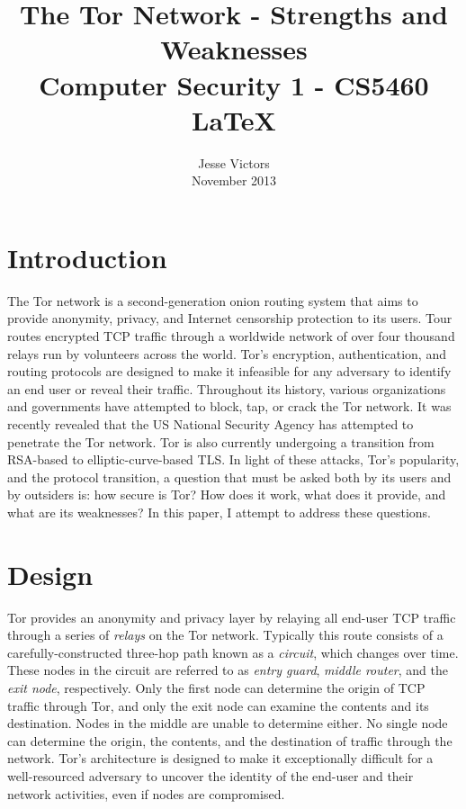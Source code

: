 \documentclass[journal]{IEEEtran}
\begin{document}
\title{The Tor Network - Strengths and Weaknesses \\ \Large Computer Security 1 - CS5460 \\ \LaTeX{}}
\author{Jesse Victors \\ November 2013}

\maketitle

\section{Introduction}

The Tor network is a second-generation onion routing system that aims to provide anonymity, privacy, and Internet censorship protection to its users. Tour routes encrypted TCP traffic through a worldwide network of over four thousand relays run by volunteers across the world. Tor's encryption, authentication, and routing protocols are designed to make it infeasible for any adversary to identify an end user or reveal their traffic. Throughout its history, various organizations and governments have attempted to block, tap, or crack the Tor network. It was recently revealed that the US National Security Agency has attempted to penetrate the Tor network. Tor is also currently undergoing a transition from RSA-based to elliptic-curve-based TLS. In light of these attacks, Tor's popularity, and the protocol transition, a question that must be asked both by its users and by outsiders is: how secure is Tor? How does it work, what does it provide, and what are its weaknesses? In this paper, I attempt to address these questions.

\section{Design}

Tor provides an anonymity and privacy layer by relaying all end-user TCP traffic through a series of \textit{relays} on the Tor network. Typically this route consists of a carefully-constructed three-hop path known as a \textit{circuit}, which changes over time. These nodes in the circuit are referred to as \textit{entry guard}, \textit{middle router}, and the \textit{exit node}, respectively. Only the first node can determine the origin of TCP traffic through Tor, and only the exit node can examine the contents and its destination. Nodes in the middle are unable to determine either. No single node can determine the origin, the contents, and the destination of traffic through the network. Tor's architecture is designed to make it exceptionally difficult for a well-resourced adversary to uncover the identity of the end-user and their network activities, even if nodes are compromised.\cite{McCoy2008}
\end{document}
